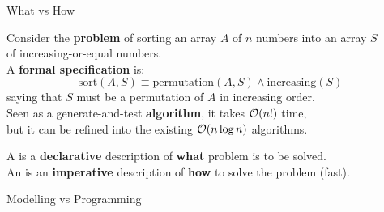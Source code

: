 \documentclass{cons-beamer}
\begin{document}
\begin{frame}{What vs How}
  \begin{example}
    Consider the \textbf{problem} of sorting an array $A$ of $n$
    numbers into an array $S$ \\ of increasing-or-equal numbers.
    \\[+8pt]

    A \textbf{formal specification} is:
    \[
      \text{sort}(A,S) \equiv
      \text{permutation}(A,S) \land \text{increasing}(S)
    \]
    saying that $S$ must be a permutation of $A$ in increasing order.
    \\[+8pt]

    Seen as a generate-and-test \textbf{algorithm}, it takes $\mathcal{O}(n!)$ time, \\
    but it can be refined into the existing $\mathcal{O}(n \log n)$ algorithms.
    \\[+8pt]
  \end{example}

  A  is a \textbf{declarative} description of \textbf{what} problem is to be solved.  \\
  An  is an \textbf{imperative} description of \textbf{how} to solve the problem (fast).
\end{frame}

\begin{frame}{Modelling vs Programming}
  \begin{center}
  \end{center}
\end{frame}
\end{document}
